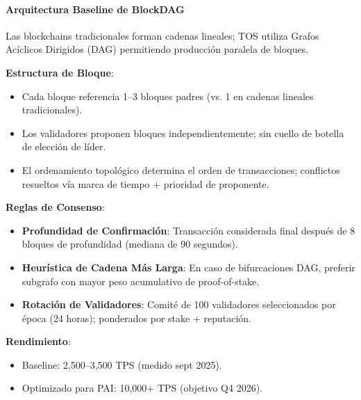 \documentclass[11pt]{article}
\begin{document}
\paragraph{Arquitectura Baseline de BlockDAG}
Las blockchains tradicionales forman cadenas lineales; TOS utiliza Grafos Acíclicos Dirigidos (DAG) permitiendo producción paralela de bloques.

\textbf{Estructura de Bloque}:
\begin{itemize}[noitemsep]
  \item Cada bloque referencia 1--3 bloques padres (vs. 1 en cadenas lineales tradicionales).
  \item Los validadores proponen bloques independientemente; sin cuello de botella de elección de líder.
  \item El ordenamiento topológico determina el orden de transacciones; conflictos resueltos vía marca de tiempo + prioridad de proponente.
\end{itemize}

\textbf{Reglas de Consenso}:
\begin{itemize}[noitemsep]
  \item \textbf{Profundidad de Confirmación}: Transacción considerada final después de 8 bloques de profundidad (mediana de 90 segundos).
  \item \textbf{Heurística de Cadena Más Larga}: En caso de bifurcaciones DAG, preferir subgrafo con mayor peso acumulativo de proof-of-stake.
  \item \textbf{Rotación de Validadores}: Comité de 100 validadores seleccionados por época (24 horas); ponderados por stake + reputación.
\end{itemize}

\textbf{Rendimiento}:
\begin{itemize}[noitemsep]
  \item Baseline: 2,500--3,500 TPS (medido sept 2025).
  \item Optimizado para PAI: 10,000+ TPS (objetivo Q4 2026).
\end{itemize}
\end{document}
